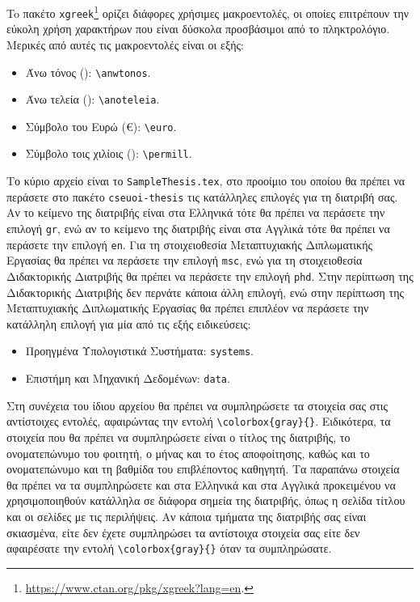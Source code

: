 To πακέτο \texttt{xgreek}\footnote{\url{https://www.ctan.org/pkg/xgreek?lang=en}.} 
ορίζει διάφορες χρήσιμες μακροεντολές, οι οποίες επιτρέπουν την εύκολη χρήση 
χαρακτήρων που είναι δύσκολα προσβάσιμοι από το πληκτρολόγιο.
Μερικές από αυτές τις μακροεντολές είναι οι εξής:
\begin{itemize}
	\item Άνω τόνος (\anwtonos): \verb|\anwtonos|.
	\item Άνω τελεία (\anoteleia): \verb|\anoteleia|.
	\item Σύμβολο του Ευρώ (\euro): \verb|\euro|.
	\item Σύμβολο τοις χιλίοις (\permill): \verb|\permill|.
\end{itemize}

Το κύριο αρχείο είναι το \texttt{SampleThesis.tex}, στο προοίμιο του οποίου 
θα πρέπει να περάσετε στο πακέτο \texttt{cseuoi-thesis} τις κατάλληλες 
επιλογές για τη διατριβή σας. Αν το κείμενο της διατριβής είναι στα Ελληνικά 
τότε θα πρέπει να περάσετε την επιλογή \texttt{gr}, ενώ αν το κείμενο της 
διατριβής είναι στα Αγγλικά τότε θα πρέπει να περάσετε την επιλογή \texttt{en}.
Για τη στοιχειοθεσία Μεταπτυχιακής Διπλωματικής Εργασίας θα πρέπει να περάσετε 
την επιλογή \texttt{msc}, ενώ για τη στοιχειοθεσία Διδακτορικής Διατριβής 
θα πρέπει να περάσετε την επιλογή \texttt{phd}.
Στην περίπτωση της Διδακτορικής Διατριβής δεν περνάτε κάποια άλλη επιλογή, ενώ
στην περίπτωση της Μεταπτυχιακής Διπλωματικής Εργασίας θα πρέπει επιπλέον να περάσετε 
την κατάλληλη επιλογή για μία από τις εξής ειδικεύσεις:
\begin{itemize}
	\item Προηγμένα Υπολογιστικά Συστήματα: \texttt{systems}.
	\item Επιστήμη και Μηχανική Δεδομένων: \texttt{data}.
\end{itemize}

Στη συνέχεια του ίδιου αρχείου θα πρέπει να συμπληρώσετε τα στοιχεία σας 
στις αντίστοιχες εντολές, αφαιρώντας την εντολή \verb|\colorbox{gray}{}|.
Ειδικότερα, τα στοιχεία που θα πρέπει να συμπληρώσετε είναι ο τίτλος της 
διατριβής, το ονοματεπώνυμο του φοιτητή, ο μήνας και το έτος αποφοίτησης, 
καθώς και το ονοματεπώνυμο και τη βαθμίδα του επιβλέποντος καθηγητή.
Τα παραπάνω στοιχεία θα πρέπει να τα συμπληρώσετε και στα Ελληνικά και στα 
Αγγλικά προκειμένου να χρησιμοποιηθούν κατάλληλα σε διάφορα σημεία της 
διατριβής, όπως η σελίδα τίτλου και οι σελίδες με τις περιλήψεις.
Αν κάποια τμήματα της διατριβής σας είναι σκιασμένα, είτε δεν έχετε 
συμπληρώσει τα αντίστοιχα στοιχεία σας είτε δεν αφαιρέσατε την εντολή 
\verb|\colorbox{gray}{}| όταν τα συμπληρώσατε.

